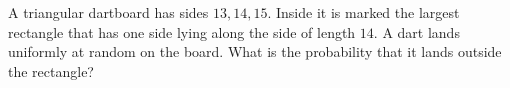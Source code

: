 A triangular dartboard has sides $13,14,15$. Inside it is marked the largest rectangle that has one side lying along the side of length $14$. A dart lands uniformly at random on the board. What is the probability that it lands outside the rectangle?
